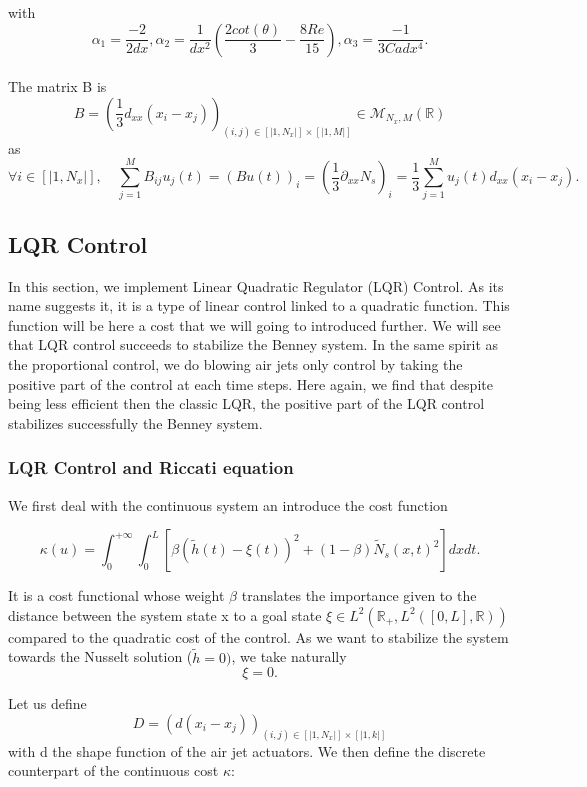 \documentclass[12pt]{article}
\begin{document}
with $$\alpha_1 = \frac{-2}{2dx}, \alpha_2 = \frac{1}{dx^2}(\frac{2cot(\theta)}{3}-\frac{8Re}{15}), \alpha_3 = \frac{-1}{3Cadx^4}.$$
\\

The matrix B is 
\begin{equation}
    \boxed{
    B = (\frac{1}{3}d_{xx}(x_i-x_j))_{(i, j)\in[|1,N_x|]\times[|1, M|]} \in \mathcal{M}_{N_x, M}(\mathbb{R})
    }
\end{equation}
as $$ \forall i \in [|1, N_x|], \quad \sum_{j=1}^MB_{ij}u_j(t) = (B u(t))_i = (\frac{1}{3}\partial_{xx}N_s)_i = \frac{1}{3}\sum_{j=1}^M u_j(t)d_{xx}(x_i-x_j).$$


\subsection{LQR Control}
In this section, we implement Linear Quadratic Regulator (LQR) Control. As its name suggests it, it is a type of linear control linked to a quadratic function. This function will be here a cost that we will going to introduced further. We will see that LQR control succeeds to stabilize the Benney system. In the same spirit as the proportional control, we do blowing air jets only control by taking the positive part of the control at each time steps. Here again, we find that despite being less efficient then the classic LQR, the positive part of the LQR control stabilizes successfully the Benney system. 

\subsubsection{LQR Control and Riccati equation}
We first deal with the continuous system an introduce the cost function 

\begin{equation}
    \kappa(u) = \int_0^{+\infty}\int_0^L \left[\beta (\tilde{h}(t)-\xi(t))^2+ (1-\beta)\tilde{N}_s(x,t)^2\right]dxdt.
\end{equation}

It is a cost functional whose weight $\beta$ translates the importance given to the distance between the system state x to a goal state $\xi \in L^2(\mathbb{R}_+, L^2([0,L],\mathbb{R}))$ compared to the quadratic cost of the control. As we want to stabilize the system towards the Nusselt solution ($\tilde{h}=0)$, we take naturally $$\xi = 0.$$




Let us define $$D=(d(x_i-x_j))_{(i,j)\in [|1,N_x|]\times [|1,k|]}$$ with d the shape function of the air jet actuators. We then define the discrete counterpart of the continuous cost $\kappa$: 
\end{document}

